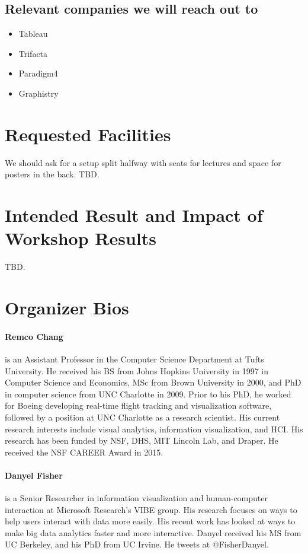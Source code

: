 \documentclass[journal]{vgtc}                %
\begin{document}
\subsection*{Relevant companies we will reach out to}
\begin{itemize}[topsep=0pt, partopsep=0pt, itemsep=-3pt]
\item Tableau
\item Trifacta
\item Paradigm4
\item Graphistry
\end{itemize}

\section{Requested Facilities}

We should ask for a setup split halfway with seats for lectures and space for posters in the back. TBD.

\section{Intended Result and Impact of Workshop Results}

TBD.


\section{Organizer Bios}

\paragraph*{Remco Chang} is an Assistant Professor in the Computer Science Department at Tufts University. He received his BS from Johns Hopkins University in 1997 in Computer Science and Economics, MSc from Brown University in 2000, and PhD in computer science from UNC Charlotte in 2009. Prior to his PhD, he worked for Boeing developing real-time flight tracking and visualization software, followed by a position at UNC Charlotte as a research scientist. His current research interests include visual analytics, information visualization, and HCI. His research has been funded by NSF, DHS, MIT Lincoln Lab, and Draper. He received the NSF CAREER Award in 2015.

\paragraph*{Danyel Fisher} is a Senior Researcher in information visualization and human-computer interaction at Microsoft Research's VIBE group. His research focuses on ways to help users interact with data more easily. His recent work has looked at ways to make big data analytics faster and more interactive. Danyel received his MS from UC Berkeley, and his PhD from UC Irvine. He tweets at @FisherDanyel.
\end{document}
